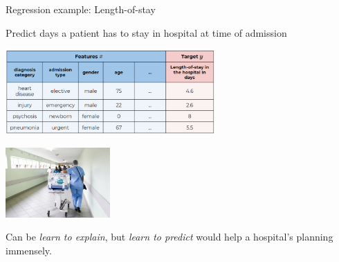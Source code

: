 \documentclass[11pt,compress,t,notes=noshow, xcolor=table]{beamer}
\begin{document}

\begin{vbframe}{Regression example: Length-of-stay}

  Predict days a patient has to stay in hospital at time of admission


    \begin{center}
    \includegraphics[width=0.6\textwidth]{figure_man/ml-basics-supervised-task-hosp-data.png}

    \lz

    \includegraphics[width=0.3\textwidth]{figure_man/ml-basics-supervised-task-hosp-pic.jpg}

    \end{center}

    Can be \textit{learn to explain}, but \textit{learn to predict} would help
    a hospital's planning immensely.



\end{vbframe}

\end{document}

